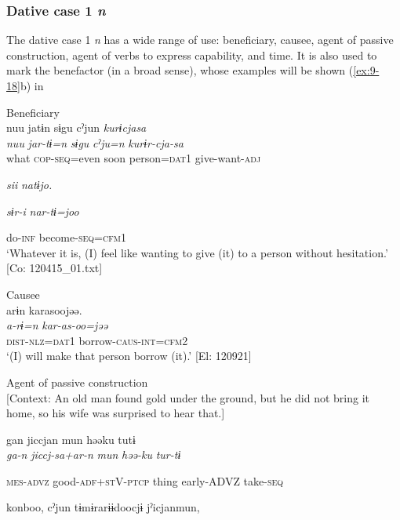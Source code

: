 \begin{table}
\subsubsection{Dative case 1 \textit{n}}

The dative case 1 \textit{n} has a wide range of use: beneficiary, causee, agent of passive construction, agent of verbs to express capability, and time. It is also used to mark the benefactor (in a broad sense), whose examples will be shown (\ref{ex:9-18}b) in 

\ea\label{ex:6-55}
\ea Beneficiary\\
{\TM}
\glll  nuu  jatɨn  sɨgu  cˀjun  \textit{kurɨcjasa}\\
\textit{nuu}  \textit{jar-tɨ=n}  \textit{sɨgu}  \textit{cˀju=n}  \textit{kurɨr-cja-sa}\\
what  \textsc{cop}-\textsc{seq}=even  soon  person=\textsc{dat}1  give-want-\textsc{adj}

      \textit{sii}  \textit{natɨjo.}

      \textit{sɨr-i}  \textit{nar-tɨ=joo}

      do-\textsc{inf}  become-\textsc{seq}=\textsc{cfm}1\\
\glt ‘Whatever it is, (I) feel like wanting to give (it) to a person without hesitation.’ [Co: 120415\_01.txt]
\z

\ex Causee\\
{\TM}
\glll  arɨn  karasoojəə.\\
\textit{a-rɨ=n}  \textit{kar-as-oo=jəə}\\
\textsc{dist}-\textsc{nlz}=\textsc{dat}1  borrow-\textsc{caus}-\textsc{int}=\textsc{cfm}2\\
\glt ‘(I) will make that person borrow (it).’ [El: 120921]

\ex Agent of passive construction\\{}
[Context: An old man found gold under the ground, but he did not bring it home, so his wife was surprised to hear that.]

{\TM}
\glll gan  jiccjan  mun  həəku  tutɨ\\

      \textit{ga-n}  \textit{jiccj-sa+ar-n}  \textit{mun}  \textit{həə-ku}  \textit{tur-tɨ}

      \textsc{mes}-\textsc{advz}  good-\textsc{adf}+\textsc{st}V-\textsc{ptcp}  thing  early-ADVZ  take-\textsc{seq}

      konboo,  cˀjun  tɨmɨrarɨɨdoocjɨ  jˀicjanmun,


\end{table}
